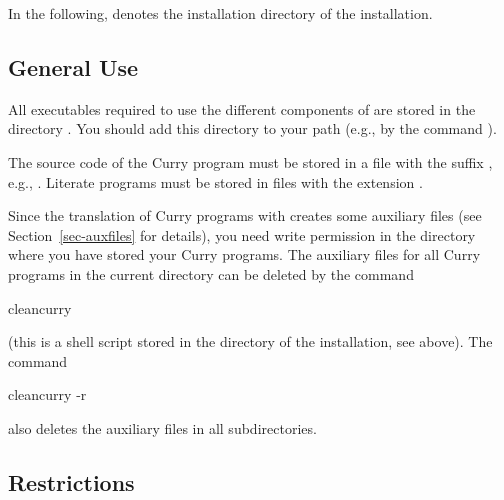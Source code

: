 In the following, \cyshome denotes the installation directory
of the \CYS installation.


\subsection{General Use}
\label{sec-general}

All executables required to use the different components
of \CYS are stored in the directory .
You should add this directory
to your path (e.g., by the  command
).

The source code of the Curry program
must be stored in a file with the suffix ,
e.g., .
Literate programs must be stored in files with the extension .

Since the translation of Curry programs with \CYS creates
some auxiliary files (see Section~\ref{sec-auxfiles} for details),
you need write permission
in the directory where you have stored your Curry programs.
The auxiliary files for all Curry programs in the current
directory can be deleted by the command
\begin{curry}
cleancurry
\end{curry}
(this is a shell script stored in the  directory of the
\CYS installation, see above).
The command
\begin{curry}
cleancurry -r
\end{curry}
also deletes the auxiliary files in all subdirectories.



\subsection{Restrictions}
\label{sec-restrictions}


